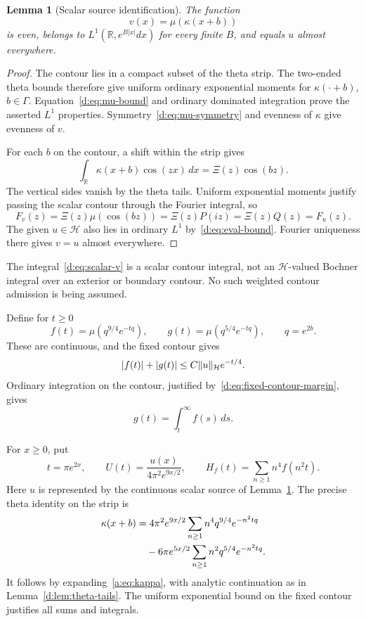 \documentclass[11pt,a4paper]{article}
\numberwithin{equation}{section}
\newtheorem{lemma}[theorem]{Lemma}
\theoremstyle{definition}\newtheorem{definition}[theorem]{Definition}
\theoremstyle{remark}\newtheorem{remark}[theorem]{Remark}
\newcommand{\R}{\mathbb R}\newcommand{\C}{\mathbb C}\newcommand{\N}{\mathbb N}
\newcommand{\Hh}{\mathcal H}\newcommand{\Hw}{\mathcal H}
\begin{document}
\begin{lemma}[Scalar source identification]\label{d:lem:scalar-source}
The function
\begin{equation}\label{d:eq:scalar-v}
 v(x)=\mu(\kappa(x+b))
\end{equation}
is even, belongs to $L^1(\R,e^{B|x|}dx)$ for every finite $B$, and equals $u$ almost everywhere.
\end{lemma}
\begin{proof}
The contour lies in a compact subset of the theta strip. The two-ended theta bounds therefore give uniform ordinary exponential moments for $\kappa(\cdot+b)$, $b\in\Gamma$. Equation~\eqref{d:eq:mu-bound} and ordinary dominated integration prove the asserted $L^1$ properties. Symmetry~\eqref{d:eq:mu-symmetry} and evenness of $\kappa$ give evenness of $v$.

For each $b$ on the contour, a shift within the strip gives
\[
 \int_\R\kappa(x+b)\cos(zx)\,dx=\Xi(z)\cos(bz).
\]
The vertical sides vanish by the theta tails. Uniform exponential moments justify passing the scalar contour through the Fourier integral, so
\[
 F_v(z)=\Xi(z)\mu(\cos(bz))=\Xi(z)P(iz)=\Xi(z)Q(z)=F_u(z).
\]
The given $u\in\Hh$ also lies in ordinary $L^1$ by~\eqref{d:eq:eval-bound}. Fourier uniqueness there gives $v=u$ almost everywhere.
\end{proof}

The integral~\eqref{d:eq:scalar-v} is a scalar contour integral, not an $\Hh$-valued Bochner integral over an exterior or boundary contour. No such weighted contour admission is being assumed.

Define for $t\ge0$
\begin{equation}\label{d:eq:fg-source}
 f(t)=\mu(q^{9/4}e^{-tq}),\qquad
 g(t)=\mu(q^{5/4}e^{-tq}),\qquad q=e^{2b}.
\end{equation}
These are continuous, and the fixed contour gives
\begin{equation}\label{d:eq:fg-crude}
 |f(t)|+|g(t)|\le C\norm{u}_{\Hh}e^{-t/4}.
\end{equation}
Ordinary integration on the contour, justified by~\eqref{d:eq:fixed-contour-margin}, gives
\begin{equation}\label{d:eq:g-tail}
 g(t)=\int_t^\infty f(s)\,ds.
\end{equation}

For $x\ge0$, put
\begin{equation}\label{d:eq:t-U-H}
 t=\pi e^{2x},\qquad
 U(t)=\frac{u(x)}{4\pi^2e^{9x/2}},\qquad
 H_f(t)=\sum_{n\ge1}n^4f(n^2t).
\end{equation}
Here $u$ is represented by the continuous scalar source of Lemma~\ref{d:lem:scalar-source}. The precise theta identity on the strip is
\begin{align}
 \kappa(x+b)
 &=4\pi^2e^{9x/2}\sum_{n\ge1}n^4q^{9/4}e^{-n^2tq}\notag\\
 &\quad-6\pi e^{5x/2}\sum_{n\ge1}n^2q^{5/4}e^{-n^2tq}.
 \label{d:eq:exact-theta-q}
\end{align}
It follows by expanding~\eqref{a:eq:kappa}, with analytic continuation as in Lemma~\ref{d:lem:theta-tails}. The uniform exponential bound on the fixed contour justifies all sums and integrals.
\end{document}
